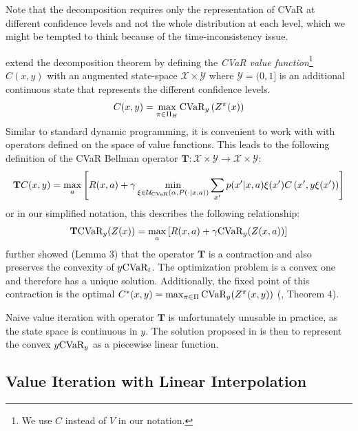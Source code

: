 Note that the decomposition requires only the representation of CVaR at different confidence levels and not the whole distribution at each level, which we might be tempted to think because of the time-inconsistency issue.

\citet{chow2015risk} extend the decomposition theorem by defining the \emph{CVaR value function}\footnote{We use $C$ instead of $V$ in our notation.} $C(x, y)$ with an augmented state-space $\mathcal{X}\times\mathcal{Y}$ where $\mathcal{Y}=(0,1]$ is an additional continuous state that represents the different confidence levels.
%
\begin{equation}\label{eqn:cdef}
C(x, y)=\max_{\pi \in \Pi_H} \text{CVaR}_{y}\left( {Z^\pi(x)} \right)
\end{equation}
%
Similar to standard dynamic programming, it is convenient to work with with operators defined on the space of value functions. This leads to the following definition of the CVaR Bellman operator $\mathbf{T}:\mathcal{X}\times\mathcal{Y}\to\mathcal{X}\times\mathcal{Y}$:
%
\begin{equation}
\mathbf{T}C(x, y) = \max_a \left[ { R(x, a) + \gamma \min_{\xi \in \mathcal{U}_{\text{CVaR}}(\alpha, P(\cdot | x, a))} \sum_{x'} p(x'| x, a)\xi(x') C\left( {x', y\xi(x')} \right)} \right]
\end{equation}
%
or in our simplified notation, this describes the following relationship:
%
\begin{equation}\label{eqn:tcvar}
\mathbf{T} \text{CVaR}_y(Z(x))=\max_a \left[ {R(x, a) + \gamma \text{CVaR}_{y}(Z(x, a))} \right]
\end{equation}
%
\citet{chow2015risk} further showed (Lemma 3) that the operator $\mathbf{T}$ is a contraction and also preserves the convexity of $y \text{CVaR}_t$. The optimization problem  is a convex one and therefore has a unique solution. Additionally, the fixed point of this contraction is the optimal $C^*(x, y) = \max_{\pi \in \Pi} \text{CVaR}_y (Z^\pi(x, y))$ (\citep{chow2015risk}, Theorem 4).
 
Naive value iteration with operator $\mathbf{T}$ is unfortunately unusable in practice, as the state space is continuous in $y$. The solution proposed in \cite{chow2015risk} is then to represent the convex $y\text{CVaR}_y$ as a piecewise linear function. 

\subsection{Value Iteration with Linear Interpolation}

